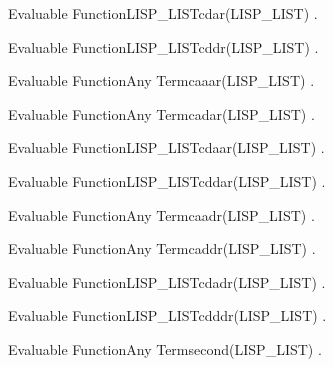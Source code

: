\begin{typeefa}{Evaluable Function}{LISP\_LIST}{cdar}{(LISP\_LIST)}
.
\end{typeefa}

\begin{typeefa}{Evaluable Function}{LISP\_LIST}{cddr}{(LISP\_LIST)}
.
\end{typeefa}

\begin{typeefa}{Evaluable Function}{Any Term}{caaar}{(LISP\_LIST)}
.
\end{typeefa}

\begin{typeefa}{Evaluable Function}{Any Term}{cadar}{(LISP\_LIST)}
.
\end{typeefa}

\begin{typeefa}{Evaluable Function}{LISP\_LIST}{cdaar}{(LISP\_LIST)}
.
\end{typeefa}

\begin{typeefa}{Evaluable Function}{LISP\_LIST}{cddar}{(LISP\_LIST)}
.
\end{typeefa}

\begin{typeefa}{Evaluable Function}{Any Term}{caadr}{(LISP\_LIST)}
.
\end{typeefa}

\begin{typeefa}{Evaluable Function}{Any Term}{caddr}{(LISP\_LIST)}
.
\end{typeefa}

\begin{typeefa}{Evaluable Function}{LISP\_LIST}{cdadr}{(LISP\_LIST)}
.
\end{typeefa}

\begin{typeefa}{Evaluable Function}{LISP\_LIST}{cdddr}{(LISP\_LIST)}
.
\end{typeefa}

\begin{typeefa}{Evaluable Function}{Any Term}{second}{(LISP\_LIST)}
.
\end{typeefa}

